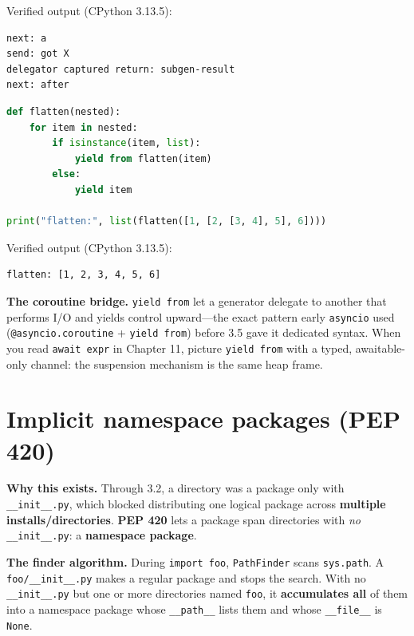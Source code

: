 Verified output (CPython 3.13.5):

\begin{lstlisting}[caption={Output}]
next: a
send: got X
delegator captured return: subgen-result
next: after
\end{lstlisting}

\begin{lstlisting}[language=Python, caption={yield from composes generators cleanly (recursive flatten).}]
def flatten(nested):
    for item in nested:
        if isinstance(item, list):
            yield from flatten(item)
        else:
            yield item

print("flatten:", list(flatten([1, [2, [3, 4], 5], 6])))
\end{lstlisting}

Verified output (CPython 3.13.5):

\begin{lstlisting}[caption={Output}]
flatten: [1, 2, 3, 4, 5, 6]
\end{lstlisting}

\textbf{The coroutine bridge.} \texttt{yield from} let a generator delegate to another that
performs I/O and yields control upward---the exact pattern early \texttt{asyncio} used
(\texttt{@asyncio.coroutine} + \texttt{yield from}) before 3.5 gave it dedicated syntax. When you
read \texttt{await expr} in Chapter 11, picture \texttt{yield from} with a typed, awaitable-only
channel: the suspension mechanism is the same heap frame.

\section{Implicit namespace packages (PEP 420)}

\textbf{Why this exists.} Through 3.2, a directory was a package only with \texttt{\_\_init\_\_.py},
which blocked distributing one logical package across \textbf{multiple installs/directories}.
\textbf{PEP 420} lets a package span directories with \emph{no} \texttt{\_\_init\_\_.py}: a
\textbf{namespace package}.

\textbf{The finder algorithm.} During \texttt{import foo}, \texttt{PathFinder} scans
\texttt{sys.path}. A \texttt{foo/\_\_init\_\_.py} makes a regular package and stops the search. With
no \texttt{\_\_init\_\_.py} but one or more directories named \texttt{foo}, it \textbf{accumulates
all} of them into a namespace package whose \texttt{\_\_path\_\_} lists them and whose
\texttt{\_\_file\_\_} is \texttt{None}.

